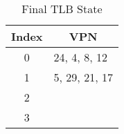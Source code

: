 \begin{parts}
     \begin{table}[ht]
        \centering
        \caption{Final TLB State}
        \label{tab:tlb_state_2}
        \renewcommand{\arraystretch}{1.5} 
        \begin{tabular}{|c|p{5cm}|} %
        \hline %
        \multicolumn{1}{|c|}{\textbf{Index}} & \multicolumn{1}{c|}{\textbf{VPN}} \\ 
        \hline
        0 & 24, 4, 8, 12 \\ \hline
        1 & 5, 29, 21, 17 \\ \hline
        2 & \\ \hline
        3 & \\ \hline
        \end{tabular}
    \end{table}


\end{parts}